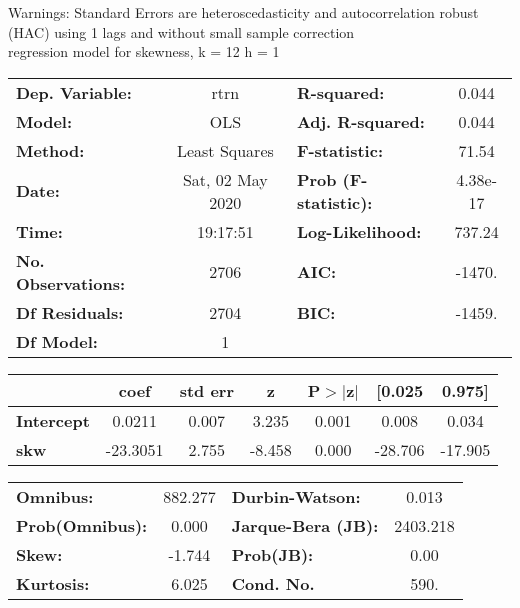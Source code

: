 Warnings: \newline
 [1] Standard Errors are heteroscedasticity and autocorrelation robust (HAC) using 1 lags and without small sample correction\\ 

regression model for skewness, k = 12 h = 1\begin{center}
\begin{tabular}{lclc}
\toprule
\textbf{Dep. Variable:}    &       rtrn       & \textbf{  R-squared:         } &     0.044   \\
\textbf{Model:}            &       OLS        & \textbf{  Adj. R-squared:    } &     0.044   \\
\textbf{Method:}           &  Least Squares   & \textbf{  F-statistic:       } &     71.54   \\
\textbf{Date:}             & Sat, 02 May 2020 & \textbf{  Prob (F-statistic):} &  4.38e-17   \\
\textbf{Time:}             &     19:17:51     & \textbf{  Log-Likelihood:    } &    737.24   \\
\textbf{No. Observations:} &        2706      & \textbf{  AIC:               } &    -1470.   \\
\textbf{Df Residuals:}     &        2704      & \textbf{  BIC:               } &    -1459.   \\
\textbf{Df Model:}         &           1      & \textbf{                     } &             \\
\bottomrule
\end{tabular}
\begin{tabular}{lcccccc}
                   & \textbf{coef} & \textbf{std err} & \textbf{z} & \textbf{P$> |$z$|$} & \textbf{[0.025} & \textbf{0.975]}  \\
\midrule
\textbf{Intercept} &       0.0211  &        0.007     &     3.235  &         0.001        &        0.008    &        0.034     \\
\textbf{skw}       &     -23.3051  &        2.755     &    -8.458  &         0.000        &      -28.706    &      -17.905     \\
\bottomrule
\end{tabular}
\begin{tabular}{lclc}
\textbf{Omnibus:}       & 882.277 & \textbf{  Durbin-Watson:     } &    0.013  \\
\textbf{Prob(Omnibus):} &   0.000 & \textbf{  Jarque-Bera (JB):  } & 2403.218  \\
\textbf{Skew:}          &  -1.744 & \textbf{  Prob(JB):          } &     0.00  \\
\textbf{Kurtosis:}      &   6.025 & \textbf{  Cond. No.          } &     590.  \\
\bottomrule
\end{tabular}
\end{center}

